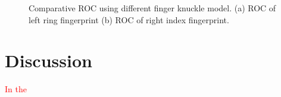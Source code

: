 \begin{figure}[ht]
    \centering
    \caption{Comparative ROC using different finger knuckle model. (a) ROC of left ring fingerprint (b) ROC of right index fingerprint.}
    \label{compare-fingerknuckle}
\end{figure}

\section{Discussion\label{discussion}}

\textcolor{red}{In the }

